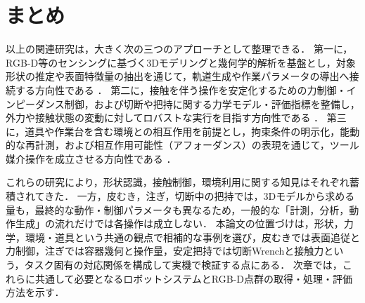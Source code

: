 \section{まとめ}
以上の関連研究は，大きく次の三つのアプローチとして整理できる．
第一に，RGB-D等のセンシングに基づく3Dモデリングと幾何学的解析を基盤とし，対象形状の推定や表面特徴量の抽出を通じて，軌道生成や作業パラメータの導出へ接続する方向性である
\cite{Yuan2021RGBDIndoorSurvey,Li2024RGBTSDF,GSFusion2024,Lee2024InFusionSurf,Nguyen2013PointCloudSegSurvey,MartinezOtzeta2022RANSACSurvey,Yu2021PointCloudSlicingRobotica,Zhang2025ContourParallelToolpathPointCloud,Zeng2024ShapeFollowingLaserCleaning}．
第二に，接触を伴う操作を安定化するための力制御・インピーダンス制御，および切断や把持に関する力学モデル・評価指標を整備し，外力や接触状態の変動に対してロバストな実行を目指す方向性である
\cite{Hogan1985ImpedanceControl,RaibertCraig1981Hybrid,Bicchi1995Closure,FerrariCanny1992OptimalGrasps,RoaSuarez2014GraspQualityReview,Mu2019RoboticCutting,Jamdagni2019FractureMechanicsCutting,Zhou2006PressingSlicingCutting,Long2014ForceVisionCutting,Mitsioni2021FoodCuttingDynamics,MuJia2022PropertyKnifeOpt}．
第三に，道具や作業台を含む環境との相互作用を前提とし，拘束条件の明示化，能動的な再計測，および相互作用可能性（アフォーダンス）の表現を通じて，ツール媒介操作を成立させる方向性である
\cite{Bohg2016InteractivePerception,Ardon2021AffordanceReview,Stilman2011ConstrainedManipulation,Nakatsuru2023EnvironmentSupport,Mottaghi2017GlassHalfFull}．

\begin{revisionblock}
これらの研究により，形状認識，接触制御，環境利用に関する知見はそれぞれ蓄積されてきた．
一方，皮むき，注ぎ，切断中の把持では，3Dモデルから求める量も，最終的な動作・制御パラメータも異なるため，一般的な「計測，分析，動作生成」の流れだけでは各操作は成立しない．
本論文の位置づけは，形状，力学，環境・道具という共通の観点で相補的な事例を選び，皮むきでは表面追従と力制御，注ぎでは容器幾何と操作量，安定把持では切断Wrenchと接触力という，タスク固有の対応関係を構成して実機で検証する点にある．
次章では，これらに共通して必要となるロボットシステムとRGB-D点群の取得・処理・評価方法を示す．
\end{revisionblock}








